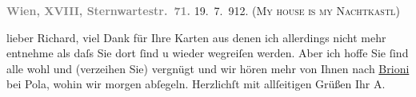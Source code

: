 \pstart
           \noindent{}\centering{}{\pb}\textcolor{gray}{\textbf{Wien, XVIII, Sternwartestr. 71.}}\pend
           \vspace{1em}
\pstart
           \raggedleft{}{\pb}19. 7. 912.\pend
           \vspace{0.5em}
\pstart
           (\textsc{My house is my Nachtkastl})\pend
           
\pstart
           {\pb}lieber Richard, viel Dank für Ihre Karten aus denen ich allerdings
               nicht mehr entnehme als daſs Sie dort{ }ſind u wieder wegreiſen werden. Aber ich hoffe
               Sie{ }ſind alle wohl und (verzeihen Sie) vergnügt und wir hören mehr von Ihnen nach \uline{Brioni} bei Pola, wohin wir morgen abſegeln.
               Herzlichſt mit allſeitigen Grüßen\pend
           \pstart Ihr \spacefill\mbox{A.}\pend{}\endnumbering{}  \newcommand{\dateiname}{L02079}\newcommand{\titel}{Arthur Schnitzler an Richard Beer-Hofmann, 19. 7. 1912}\newcommand{\editorInnen}{Martin Anton Müller und Gerd-Hermann Susen}
